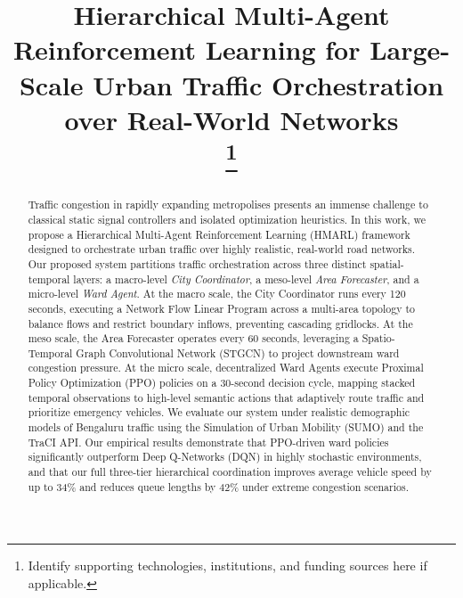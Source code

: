 \documentclass[conference]{IEEEtran}
\begin{document}
\title{Hierarchical Multi-Agent Reinforcement Learning for Large-Scale Urban Traffic Orchestration over Real-World Networks\\
\thanks{Identify supporting technologies, institutions, and funding sources here if applicable.}
}

\author{
}

\maketitle

\begin{abstract}
Traffic congestion in rapidly expanding metropolises presents an immense challenge to classical static signal controllers and isolated optimization heuristics. In this work, we propose a Hierarchical Multi-Agent Reinforcement Learning (HMARL) framework designed to orchestrate urban traffic over highly realistic, real-world road networks. Our proposed system partitions traffic orchestration across three distinct spatial-temporal layers: a macro-level \textit{City Coordinator}, a meso-level \textit{Area Forecaster}, and a micro-level \textit{Ward Agent}. At the macro scale, the City Coordinator runs every 120 seconds, executing a Network Flow Linear Program across a multi-area topology to balance flows and restrict boundary inflows, preventing cascading gridlocks. At the meso scale, the Area Forecaster operates every 60 seconds, leveraging a Spatio-Temporal Graph Convolutional Network (STGCN) to project downstream ward congestion pressure. At the micro scale, decentralized Ward Agents execute Proximal Policy Optimization (PPO) policies on a 30-second decision cycle, mapping stacked temporal observations to high-level semantic actions that adaptively route traffic and prioritize emergency vehicles. We evaluate our system under realistic demographic models of Bengaluru traffic using the Simulation of Urban Mobility (SUMO) and the TraCI API. Our empirical results demonstrate that PPO-driven ward policies significantly outperform Deep Q-Networks (DQN) in highly stochastic environments, and that our full three-tier hierarchical coordination improves average vehicle speed by up to 34\% and reduces queue lengths by 42\% under extreme congestion scenarios.
\end{abstract}
\end{document}
